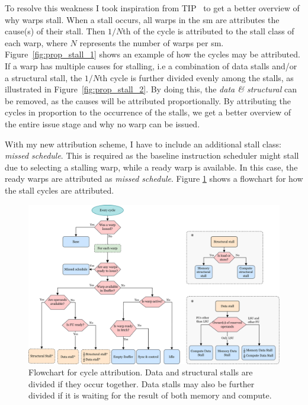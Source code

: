 To resolve this weakness I took inspiration from TIP~\cite{TIP} to get a better overview of why warps stall. When a stall occurs, all warps in the \acrshort{sm} are attributes the cause(s) of their stall. Then $1/N$th of the cycle is attributed to the stall class of each warp, where $N$ represents the number of warps per \acrshort{sm}. Figure~\ref{fig:prop_stall_1} shows an example of how the cycles may be attributed. If a warp has multiple causes for stalling, i.e a combination of data stalls and/or a structural stall, the $1/N$th cycle is further divided evenly among the stalls, as illustrated in Figure~\ref{fig:prop_stall_2}. By doing this, the \textit{data \& structural} can be removed, as the causes will be attributed proportionally. By attributing the cycles in proportion to the occurrence of the stalls, we get a better overview of the entire issue stage and why no warp can be issued. 

With my new attribution scheme, I have to include an additional stall class: \textit{missed schedule}. This is required as the baseline instruction scheduler might stall due to selecting a stalling warp, while a ready warp is available. In this case, the ready warps are attributed as \textit{missed schedule}. Figure \ref{fig:cpi_flowchart} shows a flowchart for how the stall cycles are attributed.

\begin{figure}
    \centering
    \includegraphics[width=\textwidth]{figures/flowchart_grouped_v2.png}
    \caption[Flowchart for cycle \acrshort{csv}'s cycle attribution.]{Flowchart for cycle attribution. Data and structural stalls are divided if they occur together. Data stalls may also be further divided if it is waiting for the result of both memory and compute.}
    \label{fig:cpi_flowchart}
\end{figure}